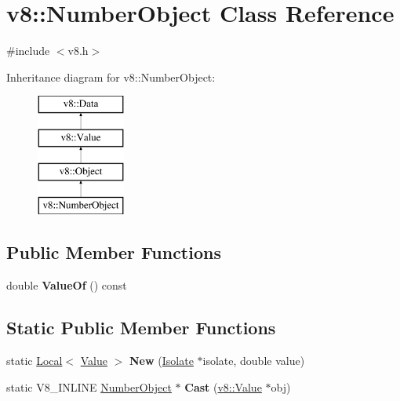 \hypertarget{classv8_1_1_number_object}{}\section{v8\+:\+:Number\+Object Class Reference}
\label{classv8_1_1_number_object}


{\ttfamily \#include $<$v8.\+h$>$}

Inheritance diagram for v8\+:\+:Number\+Object\+:\begin{figure}[H]
\begin{center}
\leavevmode
\includegraphics[height=4.000000cm]{classv8_1_1_number_object}
\end{center}
\end{figure}
\subsection*{Public Member Functions}
\begin{DoxyCompactItemize}
\item 
double {\bfseries Value\+Of} () const \hypertarget{classv8_1_1_number_object_a40c7211d55bc2de1b23f475d1906b5bf}{}\label{classv8_1_1_number_object_a40c7211d55bc2de1b23f475d1906b5bf}

\end{DoxyCompactItemize}
\subsection*{Static Public Member Functions}
\begin{DoxyCompactItemize}
\item 
static \hyperlink{classv8_1_1_local}{Local}$<$ \hyperlink{classv8_1_1_value}{Value} $>$ {\bfseries New} (\hyperlink{classv8_1_1_isolate}{Isolate} $\ast$isolate, double value)\hypertarget{classv8_1_1_number_object_afada011e39331dab09261e81b349c4a2}{}\label{classv8_1_1_number_object_afada011e39331dab09261e81b349c4a2}

\item 
static V8\+\_\+\+I\+N\+L\+I\+NE \hyperlink{classv8_1_1_number_object}{Number\+Object} $\ast$ {\bfseries Cast} (\hyperlink{classv8_1_1_value}{v8\+::\+Value} $\ast$obj)\hypertarget{classv8_1_1_number_object_a0dad558fde0ec8e51ff53a3e34dbce7e}{}\label{classv8_1_1_number_object_a0dad558fde0ec8e51ff53a3e34dbce7e}

\end{DoxyCompactItemize}
